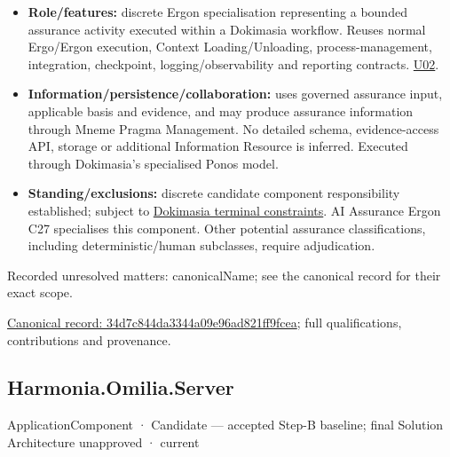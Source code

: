 \begin{itemize}


\item \textbf{Role/features:} discrete Ergon specialisation representing a bounded assurance
  activity executed within a Dokimasia workflow. Reuses normal Ergo/Ergon
  execution, Context Loading/Unloading, process-management, integration,
  checkpoint, logging/observability and reporting contracts. \href{\detokenize{../../../../../docs/markdown/05-information-systems-architecture/sources.md#u02}}{U02}.

\item \textbf{Information/persistence/collaboration:} uses governed assurance input,
  applicable basis and evidence, and may produce assurance information through
  Mneme Pragma Management. No detailed schema, evidence-access API, storage or
  additional Information Resource is inferred. Executed through Dokimasia's
  specialised Ponos model.

\item \textbf{Standing/exclusions:} discrete candidate component responsibility established;
  subject to \href{\detokenize{../../../../../docs/markdown/05-information-systems-architecture/component-register.md#dokimasia-terminal-boundaries}}{Dokimasia terminal constraints}.
  AI Assurance Ergon C27 specialises this component. Other potential assurance
  classifications, including deterministic/human subclasses, require adjudication.

\end{itemize}

{\small Recorded unresolved matters: canonicalName; see the canonical record for their exact scope.}\par
{\footnotesize \href{../../../../continuum/application/application-component/34d7c844da3344a09e96ad821ff9fcea.md}{Canonical record: 34d7c844da3344a09e96ad821ff9fcea}; full qualifications, contributions and provenance.}\par
\subsection{Harmonia.Omilia.Server}

\label{element:369907025d06492bb414a72cea834a77}
{\small ApplicationComponent · Candidate — accepted Step-B baseline; final Solution Architecture unapproved · current}\par

